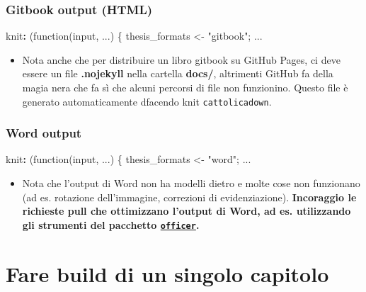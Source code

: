 \documentclass[a4paper, 11pt, nobind]{templates/ociamthesis}
\providecommand{\tightlist}{%
  \setlength{\itemsep}{0pt}\setlength{\parskip}{0pt}}
\newenvironment{Shaded}{\begin{snugshade}}{\end{snugshade}}
\newcommand{\AttributeTok}[1]{\textcolor[rgb]{0.77,0.63,0.00}{#1}}
\newcommand{\FunctionTok}[1]{\textcolor[rgb]{0.00,0.00,0.00}{#1}}
\newcommand{\KeywordTok}[1]{\textcolor[rgb]{0.13,0.29,0.53}{\textbf{#1}}}
\renewenvironment{Shaded}
{
  \vspace{10pt}%
  \begin{snugshade}%
}{%
  \end{snugshade}%
  \vspace{8pt}%
}
\begin{document}
\hypertarget{gitbook-output-html}{%
\subsubsection{Gitbook output (HTML)}\label{gitbook-output-html}}

\begin{Shaded}
\begin{Highlighting}[]
\FunctionTok{knit}\KeywordTok{:}\AttributeTok{ (function(input, ...) \{}
\AttributeTok{    thesis\_formats \textless{}{-} "gitbook";}
\AttributeTok{    ...}
\end{Highlighting}
\end{Shaded}

\begin{itemize}
\tightlist
\item
  Nota anche che per distribuire un libro gitbook su GitHub Pages, ci deve essere un file \textbf{.nojekyll} nella cartella \textbf{docs/}, altrimenti GitHub fa della magia nera che fa sì che alcuni percorsi di file non funzionino. Questo file è generato automaticamente dfacendo knit \texttt{cattolicadown}.
\end{itemize}

\hypertarget{word-output}{%
\subsubsection{Word output}\label{word-output}}

\begin{Shaded}
\begin{Highlighting}[]
\FunctionTok{knit}\KeywordTok{:}\AttributeTok{ (function(input, ...) \{}
\AttributeTok{    thesis\_formats \textless{}{-} "word";}
\AttributeTok{    ...}
\end{Highlighting}
\end{Shaded}

\begin{itemize}
\tightlist
\item
  Nota che l'output di Word non ha modelli dietro e molte cose non funzionano (ad es. rotazione dell'immagine, correzioni di evidenziazione). \textbf{Incoraggio le richieste pull che ottimizzano l'output di Word, ad es. utilizzando gli strumenti del pacchetto \href{https://github.com/davidgohel/officer}{\texttt{officer}}.}
\end{itemize}

\hypertarget{fare-build-di-un-singolo-capitolo}{%
\section{Fare build di un singolo capitolo}\label{fare-build-di-un-singolo-capitolo}}
\end{document}
